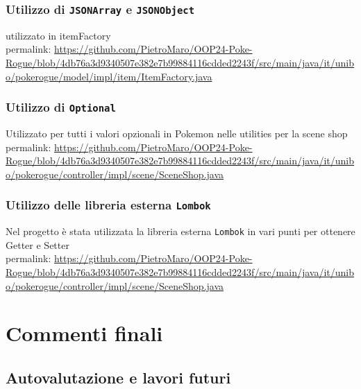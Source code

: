 \documentclass[a4paper,12pt]{report}
\begin{document}
{{\subsection*{Utilizzo di \texttt{JSONArray} e \texttt{JSONObject}}
utilizzato in itemFactory\\
permalink: \url{https://github.com/PietroMaro/OOP24-Poke-Rogue/blob/4db76a3d9340507e382e7b99884116cdded2243f/src/main/java/it/unibo/pokerogue/model/impl/item/ItemFactory.java}

\subsection*{Utilizzo di \texttt{Optional}}
Utilizzato per tutti i valori opzionali in Pokemon nelle utilities per la scene shop\\
permalink: \url{https://github.com/PietroMaro/OOP24-Poke-Rogue/blob/4db76a3d9340507e382e7b99884116cdded2243f/src/main/java/it/unibo/pokerogue/controller/impl/scene/SceneShop.java}

\subsection*{Utilizzo delle libreria esterna \texttt{Lombok}}
Nel progetto è stata utilizzata la libreria esterna \texttt{Lombok} in vari punti per ottenere Getter e Setter\\
permalink: \url{https://github.com/PietroMaro/OOP24-Poke-Rogue/blob/4db76a3d9340507e382e7b99884116cdded2243f/src/main/java/it/unibo/pokerogue/controller/impl/scene/SceneShop.java}



\chapter{Commenti finali}



\section{Autovalutazione e lavori futuri}

}}
\end{document}
